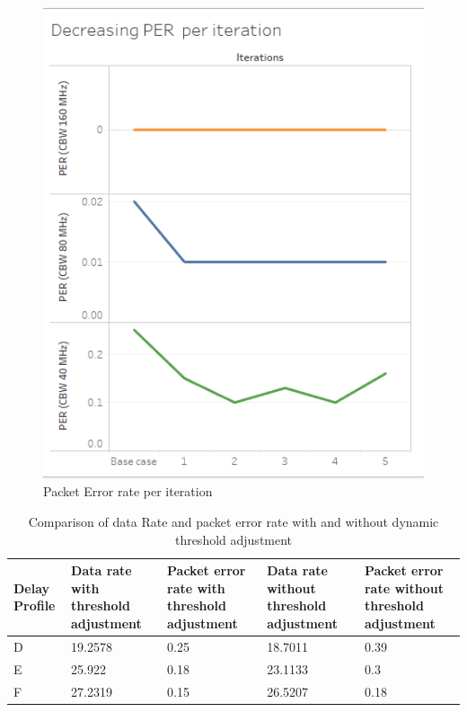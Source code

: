 \documentclass[a4paper, 10pt, conference]{ieeeconf}
\begin{document}
\begin{figure}[h]
      	\centering
     	\includegraphics[scale=0.55]{PERvsIterations.png}
      	\caption{Packet Error rate per iteration}
      	\label{Fig. 5}
\end{figure}



\begin{table}[h]
\caption{Comparison of data Rate and packet error rate with and without dynamic threshold adjustment}
\label{Table I}
\centering
\begin{center}
\begin{tabular}{|p{0.75cm}|p{1.30cm}|p{1.30cm}|p{1.30cm}|p{1.30cm}|}
  
\hline
Delay Profile  & Data rate with threshold adjustment & Packet error rate with threshold adjustment & Data rate without threshold adjustment & Packet error rate without threshold adjustment \\
\hline
D & 19.2578 & 0.25 & 18.7011 & 0.39 \\
\hline
E & 25.922 & 0.18 & 23.1133 & 0.3 \\
\hline
F & 27.2319 & 0.15 & 26.5207 & 0.18 \\

\hline
\end{tabular}
\end{center}
\end{table}
\end{document}
